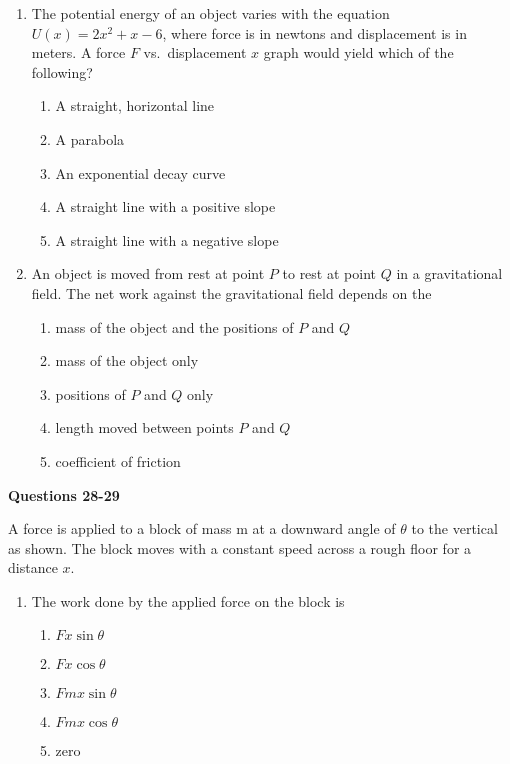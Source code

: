 \documentclass{../../oss-apphys}
\begin{document}
\begin{multicols}{2}
\begin{enumerate}[resume,leftmargin=18pt]
  \item The potential energy of an object varies with the equation
    $U(x)=2x^2+x-6$, where force is in newtons and displacement is in meters. A
    force $F$ vs.\ displacement $x$ graph would yield which of the following?
    \begin{enumerate}[noitemsep,topsep=0pt,leftmargin=18pt,label=(\Alph*)]
    \item A straight, horizontal line
    \item A parabola
    \item An exponential decay curve
    \item A straight line with a positive slope
    \item A straight line with a negative slope
    \end{enumerate}

  \item An object is moved from rest at point $P$ to rest at point $Q$ in a
    gravitational field. The net work against the gravitational field depends
    on the
    \begin{enumerate}[noitemsep,topsep=0pt,leftmargin=18pt,label=(\Alph*)]
    \item mass of the object and the positions of $P$ and $Q$
    \item mass of the object only
    \item positions of $P$ and $Q$ only
    \item length moved between points $P$ and $Q$
    \item coefficient of friction
    \end{enumerate}
  \end{enumerate}
  \columnbreak
  
  \textbf{Questions 28-29}

  A force is applied to a block of mass m at a downward angle of $\theta$ to
  the vertical as shown. The block moves with a constant speed across a rough
  floor for a distance $x$.

  \begin{enumerate}[resume,leftmargin=18pt]
  \item The work done by the applied force on the block is
    \begin{enumerate}[noitemsep,topsep=0pt,leftmargin=18pt,label=(\Alph*)]
    \item $Fx\sin\theta$
    \item $Fx\cos\theta$
    \item $Fmx\sin\theta$
    \item $Fmx\cos\theta$
    \item zero
    \end{enumerate}
    

\end{enumerate}
\end{multicols}
\end{document}

